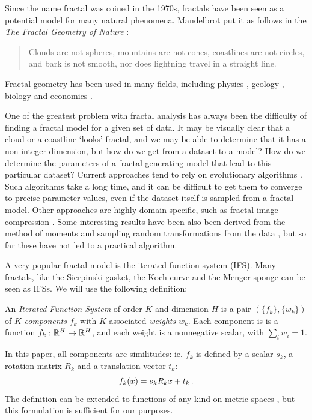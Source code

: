 Since the name fractal was coined in the 1970s, fractals have been seen as a potential model for many natural phenomena. Mandelbrot put it as follows in the \emph{The Fractal Geometry of Nature} \cite{mandelbrot1982fractal}:

\begin{quotation}
\small
\noindent Clouds are not spheres, mountains are not cones, coastlines are not circles, and bark is not smooth, nor does lightning travel in a straight line.
\end{quotation}

Fractal geometry has been used in many fields, including physics \cite{mandelbrot1984fractals}, geology \cite{cheng1997multifractal}, biology \cite{goldberger1992fractal} and economics \cite{turiel2003multifractal}.

One of the greatest problem with fractal analysis has always been the difficulty of finding a fractal model for a given set of data. It may be visually clear that a cloud or a coastline `looks' fractal, and we may be able to determine that it has a non-integer dimension, but how do we get from a dataset to a model? How do we determine the parameters of a fractal-generating model that lead to this particular dataset? Current approaches tend to rely on evolutionary algorithms \cite{deliu1991genetic}. Such algorithms take a long time, and it can be difficult to get them to converge to precise parameter values, even if the dataset itself is sampled from a fractal model.
Other approaches are highly domain-specific, such as fractal image compression \cite{hart1996fractal}. Some interesting results have been also been derived from the method of moments \cite{rinaldo1994inverse} and sampling random transformations from the data \cite{hart1997similarity}, but so far these have not led to a practical algorithm. 


A very popular fractal model is the iterated function system (IFS). Many fractals, like the Sierpinski gasket, the Koch curve and the Menger sponge can be seen as IFSs. We will use the following definition:
\begin{definition}
An \emph{Iterated Function System} of order $K$ and dimension $H$ is a pair $(\{f_k\}, \{w_k\})$ of $K$ \emph{components} $f_k$ with $K$ associated \emph{weights} $w_k$. Each component is is a function $f_k: {\mathbb R}^H \to {\mathbb R}^H$, and each weight is a nonnegative scalar, with $\sum_i w_i = 1$. 
\end{definition}
In this paper, all components are similitudes: ie. $f_k$ is defined by a scalar $s_k$, a rotation matrix $R_k$ and a translation vector $t_k$:
\[
f_k(x) = s_kR_k x + t_k \,\text{.}
\]
The definition can be extended to functions of any kind on metric spaces \cite{hutchinson2000deterministic}, but this formulation is sufficient for our purposes. 

